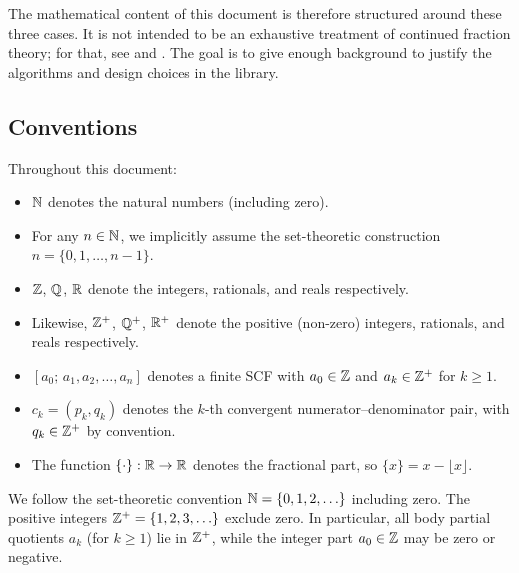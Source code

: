 The mathematical content of this document is therefore structured around these
three cases.  It is not intended to be an exhaustive treatment of continued fraction
theory; for that, see \cite{khinchin1964} and \cite{rockett1992}.  The goal is to
give enough background to justify the algorithms and design choices in the library.

\subsection{Conventions}
      
Throughout this document:
\begin{itemize}[nosep]
      \item $\mathbb{N}$ denotes the natural numbers (including zero).
      \item For any $n \in \mathbb{N}$, we implicitly assume the set-theoretic construction $n = \{0, 1, \ldots, n-1\}$.
      \item $\mathbb{Z}$, $\mathbb{Q}$, $\mathbb{R}$ denote the integers, rationals, and reals respectively.
      \item Likewise, $\mathbb{Z}^+$, $\mathbb{Q}^+$, $\mathbb{R}^+$ denote the positive (non-zero) integers, rationals, and reals respectively.
      \item $[a_0;\, a_1, a_2, \ldots, a_n]$ denotes a finite SCF with $a_0 \in \mathbb{Z}$ and
            $a_k \in \mathbb{Z}^+$ for $k \geq 1$.
      \item $c_k = (p_k, q_k)$ denotes the $k$-th convergent numerator--denominator pair, with
            $q_k \in \mathbb{Z}^+$ by convention.
      \item The function $\{\cdot\}: \mathbb{R} \to \mathbb{R}$ denotes the fractional part, so $\{x\} = x - \lfloor x \rfloor$.
\end{itemize}

\begin{remark}
  We follow the set-theoretic convention $\mathbb{N} = \{0, 1, 2, \ldots\}$ including zero.
  The positive integers $\mathbb{Z}^+ = \{1, 2, 3, \ldots\}$ exclude zero.
  In particular, all body partial quotients $a_k$ (for $k \geq 1$) lie in $\mathbb{Z}^+$,
  while the integer part $a_0 \in \mathbb{Z}$ may be zero or negative.
\end{remark}
